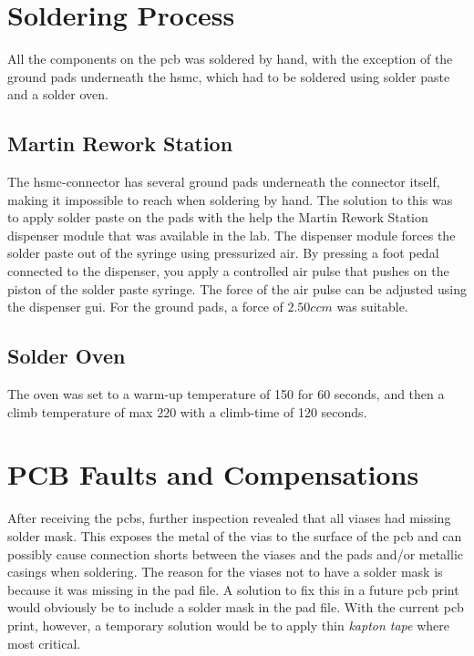 \documentclass[main.tex]{subfiles}
\begin{document}


\section{Soldering Process}

All the components on the \gls{pcb} was soldered by hand, with the exception of the ground pads underneath the \gls{hsmc}, which had to be soldered using solder paste and a solder oven.

\subsection{Martin Rework Station}

The \gls{hsmc}-connector has several ground pads underneath the connector itself, making it impossible to reach when soldering by hand. The solution to this was to apply solder paste on the pads with the help the Martin Rework Station dispenser module that was available in the lab. The dispenser module forces the solder paste out of the syringe using pressurized air. By pressing a foot pedal connected to the dispenser, you apply a controlled air pulse that pushes on the piston of the solder paste syringe. The force of the air pulse can be adjusted using the dispenser \gls{gui}. For the ground pads, a force of $2.50 ccm$ was suitable.  

\subsection{Solder Oven}

The oven was set to a warm-up temperature of 150  for 60 seconds, and then a climb temperature of max 220 with a climb-time of 120 seconds.

\section{PCB Faults and Compensations}

After receiving the \glspl{pcb}, further inspection revealed that all viases had missing solder mask. This exposes the metal of the vias to the surface of the \gls{pcb} and can possibly cause connection shorts between the viases and the pads and/or metallic casings when soldering. The reason for the viases not to have a solder mask is because it was missing in the pad file. A solution to fix this in a future \gls{pcb} print would obviously be to include a solder mask in the pad file.
With the current \gls{pcb} print, however, a temporary solution would be to apply thin \textit{kapton tape} where most critical.\\
\end{document}
